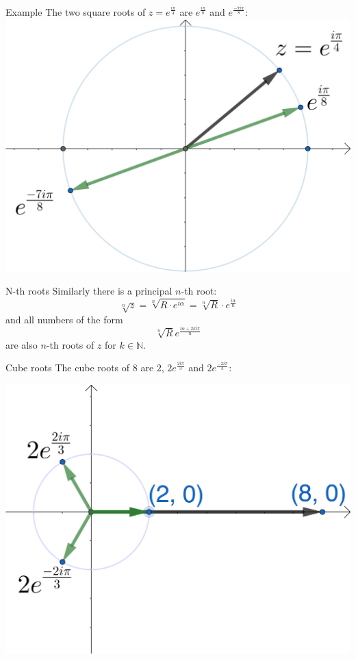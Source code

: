 \documentclass{beamer}
\begin{document}
\begin{frame}{Example}
  	The two square roots of $z = e^{\frac{i\pi}{4}}$ are $e^{\frac{i\pi}{8}}$ and $e^{\frac{-7i\pi}{8}}$:\vfill
	\includegraphics[scale=3]{roots-pi-4.png}
\end{frame}

\begin{frame}{N-th roots}
Similarly there is a principal $n$-th root:\vfill
{\LARGE
\begin{equation*}
\sqrt[n]{z} = \sqrt[n]{R\cdot e^{i\alpha}} = \sqrt[n]{R}\cdot e^{\frac{i\alpha}{n}}
\end{equation*}}\vfill
and all numbers of the form\vfill
{\LARGE
\begin{equation*}
	\sqrt[n]{R}e^{\frac{i\alpha+2ki\pi}{n}}
\end{equation*}
}\vfill
are also $n$-th roots of $z$ for $k\in \mathbb{N}$.
\end{frame}

\begin{frame}{Cube roots}
The cube roots of $8$ are $2$, $2e^{\frac{2i\pi}{3}}$ and $2e^{\frac{-2i\pi}{3}}$:\vfill
\begin{center}
\includegraphics[scale=0.7]{cube-roots-8.png}
\end{center}
\end{frame}
\end{document}

